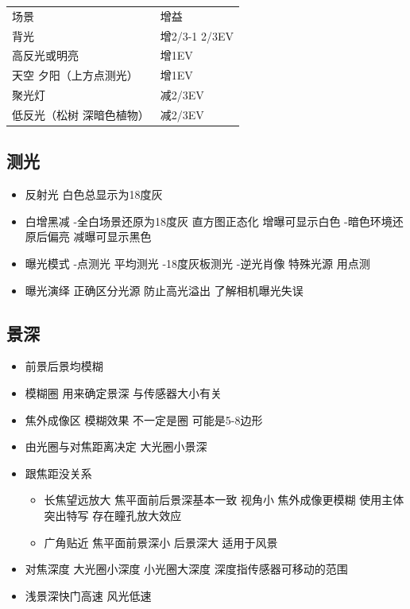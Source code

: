 \documentclass[
  letterpaper,
  DIV=11,
  numbers=noendperiod]{scrreprt}
\providecommand{\tightlist}{%
  \setlength{\itemsep}{0pt}\setlength{\parskip}{0pt}}\usepackage{longtable,booktabs,array}
\begin{document}
\begin{longtable}[]{@{}ll@{}}
\toprule\noalign{}
\endhead
\bottomrule\noalign{}
\endlastfoot
场景 & 增益 \\
背光 & 增2/3-1 2/3EV \\
高反光或明亮 & 增1EV \\
天空 夕阳（上方点测光） & 增1EV \\
聚光灯 & 减2/3EV \\
低反光（松树 深暗色植物） & 减2/3EV \\
\end{longtable}

\subsection{测光}\label{ux6d4bux5149}

\begin{itemize}
\tightlist
\item
  反射光 白色总显示为18度灰
\item
  白增黑减 -全白场景还原为18度灰 直方图正态化 增曝可显示白色
  -暗色环境还原后偏亮 减曝可显示黑色
\item
  曝光模式 -点测光 平均测光 -18度灰板测光 -逆光肖像 特殊光源 用点测
\item
  曝光演绎 正确区分光源 防止高光溢出 了解相机曝光失误
\end{itemize}

\subsection{景深}\label{ux666fux6df1}

\begin{itemize}
\tightlist
\item
  前景后景均模糊
\item
  模糊圈 用来确定景深 与传感器大小有关
\item
  焦外成像区 模糊效果 不一定是圈 可能是5-8边形
\item
  由光圈与对焦距离决定 大光圈小景深
\item
  跟焦距没关系

  \begin{itemize}
  \tightlist
  \item
    长焦望远放大 焦平面前后景深基本一致 视角小 焦外成像更模糊
    使用主体突出特写 存在瞳孔放大效应
  \item
    广角贴近 焦平面前景深小 后景深大 适用于风景
  \end{itemize}
\item
  对焦深度 大光圈小深度 小光圈大深度 深度指传感器可移动的范围
\item
  浅景深快门高速 风光低速
\end{itemize}
\end{document}
